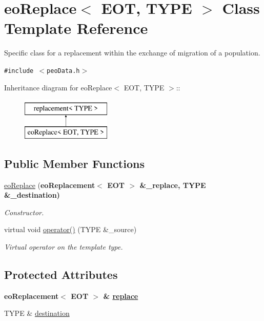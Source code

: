 \hypertarget{classeoReplace}{
\section{eo\-Replace$<$ EOT, TYPE $>$ Class Template Reference}
\label{classeoReplace}
}
Specific class for a replacement within the exchange of migration of a population.  


{\tt \#include $<$peo\-Data.h$>$}

Inheritance diagram for eo\-Replace$<$ EOT, TYPE $>$::\begin{figure}[H]
\begin{center}
\leavevmode
\includegraphics[height=2cm]{classeoReplace}
\end{center}
\end{figure}
\subsection*{Public Member Functions}
\begin{CompactItemize}
\item 
\hyperlink{classeoReplace_816081d8c7e8342d254402c5185efcbb}{eo\-Replace} (\bf{eo\-Replacement}$<$ EOT $>$ \&\_\-replace, TYPE \&\_\-destination)
\begin{CompactList}\small\item\em Constructor. \item\end{CompactList}\item 
virtual void \hyperlink{classeoReplace_786659edbd9907000138aa29caf46065}{operator()} (TYPE \&\_\-source)
\begin{CompactList}\small\item\em Virtual operator on the template type. \item\end{CompactList}\end{CompactItemize}
\subsection*{Protected Attributes}
\begin{CompactItemize}
\item 
\bf{eo\-Replacement}$<$ EOT $>$ \& \hyperlink{classeoReplace_b324e455db7f97021b0b7224a804b3e9}{replace}
\item 
\hypertarget{classeoReplace_9a0ec5ee11dfdd6f8077db89436cd5f8}{
TYPE \& \hyperlink{classeoReplace_9a0ec5ee11dfdd6f8077db89436cd5f8}{destination}}
\label{classeoReplace_9a0ec5ee11dfdd6f8077db89436cd5f8}

\end{CompactItemize}


